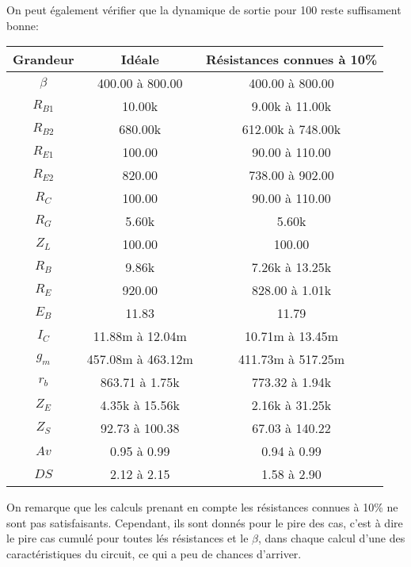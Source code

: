 \documentclass[11pt;a4paper]{report}
\begin{document}
  On peut également vérifier que la dynamique de sortie pour 100\ohm{}
   reste suffisament bonne:


   \begin{tabular}{|c|c|c|}
    \hline
    Grandeur  & Idéale           &   Résistances connues à 10\% \\\hline
    $\beta$   & 400.00 à 800.00  & 400.00 à 800.00 \\\hline
    $R_{B1}$  &      10.00k      & 9.00k à 11.00k  \\\hline
    $R_{B2}$  &     680.00k      &612.00k à 748.00k\\\hline
    $R_{E1}$  &      100.00      & 90.00 à 110.00  \\\hline
    $R_{E2}$  &      820.00      & 738.00 à 902.00 \\\hline
    $R_C$     &      100.00      & 90.00 à 110.00  \\\hline
    $R_G$     &      5.60k       &      5.60k       \\\hline
    $Z_L$     &      100.00      &      100.00      \\\hline
    $R_B$     &      9.86k       & 7.26k à 13.25k  \\\hline
    $R_E$     &      920.00      & 828.00 à 1.01k  \\\hline
    $E_B$     &      11.83       &      11.79       \\\hline
    $I_C$     & 11.88m à 12.04m  & 10.71m à 13.45m \\\hline
    $g_m$     &457.08m à 463.12m &411.73m à 517.25m\\\hline
    $r_b$     & 863.71 à 1.75k   & 773.32 à 1.94k  \\\hline
    $Z_E$     & 4.35k à 15.56k   & 2.16k à 31.25k  \\\hline
    $Z_S$     & 92.73 à 100.38   & 67.03 à 140.22  \\\hline
    $Av$      &   0.95 à 0.99    &   0.94 à 0.99   \\\hline
    $DS$      &   2.12 à 2.15    &   1.58 à 2.90\\\hline
   \end{tabular}


   On remarque que les calculs prenant en compte les résistances connues à 10\% 
   ne sont pas satisfaisants. Cependant, ils sont donnés pour le pire des cas,
   c’est à dire le pire cas cumulé pour toutes lés résistances et le $\beta$, dans chaque calcul
   d’une des caractéristiques du circuit, ce qui a peu de chances d’arriver.
    
\end{document}
